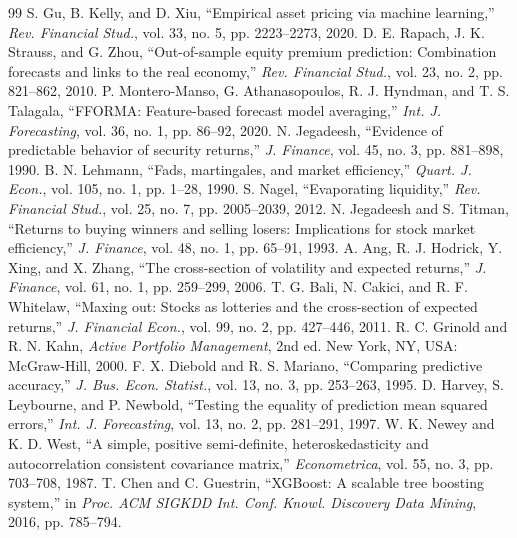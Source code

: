\begin{thebibliography}{99}
 S. Gu, B. Kelly, and D. Xiu, ``Empirical asset pricing via machine learning,'' \textit{Rev. Financial Stud.}, vol. 33, no. 5, pp. 2223--2273, 2020.
 D. E. Rapach, J. K. Strauss, and G. Zhou, ``Out-of-sample equity premium prediction: Combination forecasts and links to the real economy,'' \textit{Rev. Financial Stud.}, vol. 23, no. 2, pp. 821--862, 2010.
 P. Montero-Manso, G. Athanasopoulos, R. J. Hyndman, and T. S. Talagala, ``FFORMA: Feature-based forecast model averaging,'' \textit{Int. J. Forecasting}, vol. 36, no. 1, pp. 86--92, 2020.
 N. Jegadeesh, ``Evidence of predictable behavior of security returns,'' \textit{J. Finance}, vol. 45, no. 3, pp. 881--898, 1990.
 B. N. Lehmann, ``Fads, martingales, and market efficiency,'' \textit{Quart. J. Econ.}, vol. 105, no. 1, pp. 1--28, 1990.
 S. Nagel, ``Evaporating liquidity,'' \textit{Rev. Financial Stud.}, vol. 25, no. 7, pp. 2005--2039, 2012.
 N. Jegadeesh and S. Titman, ``Returns to buying winners and selling losers: Implications for stock market efficiency,'' \textit{J. Finance}, vol. 48, no. 1, pp. 65--91, 1993.
 A. Ang, R. J. Hodrick, Y. Xing, and X. Zhang, ``The cross-section of volatility and expected returns,'' \textit{J. Finance}, vol. 61, no. 1, pp. 259--299, 2006.
 T. G. Bali, N. Cakici, and R. F. Whitelaw, ``Maxing out: Stocks as lotteries and the cross-section of expected returns,'' \textit{J. Financial Econ.}, vol. 99, no. 2, pp. 427--446, 2011.
 R. C. Grinold and R. N. Kahn, \textit{Active Portfolio Management}, 2nd ed. New York, NY, USA: McGraw-Hill, 2000.
 F. X. Diebold and R. S. Mariano, ``Comparing predictive accuracy,'' \textit{J. Bus. Econ. Statist.}, vol. 13, no. 3, pp. 253--263, 1995.
 D. Harvey, S. Leybourne, and P. Newbold, ``Testing the equality of prediction mean squared errors,'' \textit{Int. J. Forecasting}, vol. 13, no. 2, pp. 281--291, 1997.
 W. K. Newey and K. D. West, ``A simple, positive semi-definite, heteroskedasticity and autocorrelation consistent covariance matrix,'' \textit{Econometrica}, vol. 55, no. 3, pp. 703--708, 1987.
 T. Chen and C. Guestrin, ``XGBoost: A scalable tree boosting system,'' in \textit{Proc. ACM SIGKDD Int. Conf. Knowl. Discovery Data Mining}, 2016, pp. 785--794.
\end{thebibliography}
